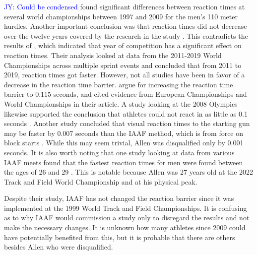 \documentclass[12pt, letterpaper, titlepage]{article}
\newcommand{\jy}[1]{\textcolor{blue}{JY: #1}}
\begin{document}
\jy{Could be condensed}
\citet{pilianidis2012start} found
significant differences between reaction times at several world championships
between 1997 and 2009 for the men's 110 meter hurdles.  Another important
conclusion was that reaction times did not decrease over the twelve years
covered by the research in the study \citep{pilianidis2012start}. This 
contradicts the results of \citet{zhang2021correlation}, which indicated that 
year of competition has a significant effect on reaction times.  Their
analysis looked at data from the 2011-2019 World Championships across multiple
sprint events and concluded that from 2011 to 2019, reaction times got
faster. However, not all studies have been in favor of a decrease in the
reaction time barrier. \citet*{brosnan2017effects} argue for increasing 
the reaction time barrier to 0.115 seconds, and cited evidence from European 
Championships and World Championships in their article.  A study looking 
at the 2008 Olympics likewise supported the conclusion that athletes could not
react in as little as 0.1 seconds \citep{lipps2011implications}.  Another study
concluded that visual reaction times to the starting gun may be faster by 0.007
seconds than the IAAF method, which is from force on block starts 
\citep{holmes2018method}.  While this may seem trivial, Allen was disqualified
only by 0.001 seconds. It is also worth noting that one study looking at data 
from various IAAF meets found that the fastest reaction times for men were found
between the ages of 26 and 29 \citep{tonnessen2013reaction}.  This is notable 
because Allen was 27 years old at the 2022 Track and Field World Championship 
and at his physical peak.


Despite their study, IAAF has not changed the reaction barrier since it was
implemented at the 1999 World Track and Field Championships.  It is confusing
as to why IAAF would commission a study only to disregard the results and not
make the necessary changes.  It is unknown how many athletes since 2009 could
have potentially benefited from this, but it is probable that there are others
besides Allen who were disqualified.
\end{document}
